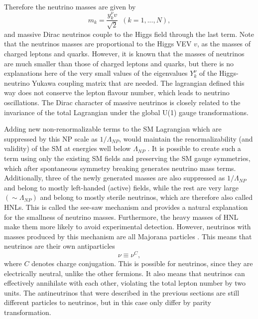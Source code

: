 Therefore the neutrino masses are given by
\begin{equation}
m_k=\frac{y_k^\nu v}{\sqrt{2}}\,\,\,\left(k=1,...,N\right),
\end{equation}
and massive Dirac neutrinos couple to the Higgs field through the last term. Note that the neutrinos masses are proportional to the Higgs VEV $v$, as the masses of charged leptons and quarks. However, it is known that the masses of neutrinos are much smaller than those of charged leptons and quarks, but there is no explanations here of the very small values of the eigenvalues $Y_k^{\nu}$ of the Higgs-neutrino Yukawa coupling matrix that are needed. The lagrangian defined this way does not conserve the lepton flavour number, which leads to neutrino oscillations. The Dirac character of massive neutrinos is closely related to the invariance of the total Lagrangian under the global U(1) gauge transformations.
\fi


Adding new non-renormalizable terms to the \gls{SM} Lagrangian which are suppressed by this \gls{NP} scale as $1/\Lambda_{NP}$, would maintain the renormalizability (and validity) of the \gls{SM} at energies well below $\Lambda_{NP}$ \cite{Gonzalez-GarciaPhenomenologyMassiveNu.pdf}. It is possible to create such a term using only the existing \gls{SM} fields and preserving the \gls{SM} gauge symmetries, which after spontaneous symmetry breaking generates neutrino mass terms. Additionally, three of the newly generated masses are also suppressed as $1/\Lambda_{NP}$ and belong to mostly left-handed (active) fields, while the rest are very large $\left(\sim\Lambda_{NP}\right)$ and belong to mostly sterile neutrinos, which are therefore also called \glspl{HNL}. This is called the see-saw mechanism \cite{SeeSawMechanism1979.pdf} and provides a natural explanation for the smallness of neutrino masses. Furthermore, the heavy masses of \gls{HNL} make them more likely to avoid experimental detection. However, neutrinos with masses produced by this mechanism are all Majorana particles \cite{MajoranaOriginalPaper.pdf}. This means that neutrinos are their own antiparticles
\begin{equation}
\nu\equiv\nu^C,
\end{equation}
where $C$ denotes charge conjugation. This is possible for neutrinos, since they are electrically neutral, unlike the other fermions. It also means that neutrinos can effectively annihilate with each other, violating the total lepton number by two units. The antineutrinos that were described in the previous sections are still different particles to neutrinos, but in this case only differ by parity transformation.

